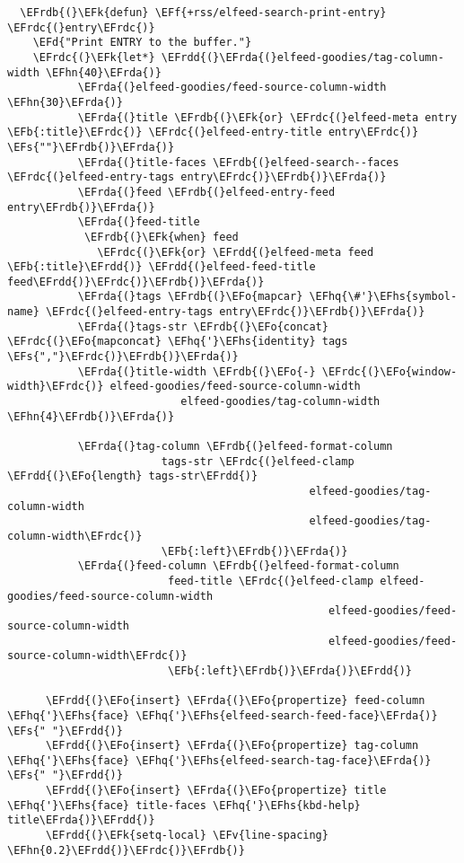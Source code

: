 \documentclass[c]{article}
\theoremstyle{plain}%
\theoremstyle{definition}
\theoremstyle{remark}
\newcommand{\EFs}[1]{\textcolor{EFs}{#1}} %
\newcommand{\EFd}[1]{\textcolor{EFd}{#1}} %
\newcommand{\EFk}[1]{\textcolor{EFk}{#1}} %
\newcommand{\EFb}[1]{\textcolor{EFb}{#1}} %
\newcommand{\EFf}[1]{\textcolor{EFf}{#1}} %
\newcommand{\EFv}[1]{\textcolor{EFv}{#1}} %
\newcommand{\EFo}[1]{\textcolor{EFo}{#1}} %
\newcommand{\EFhn}[1]{\textcolor{EFhn}{\textbf{#1}}} %
\newcommand{\EFhq}[1]{\textcolor{EFhq}{#1}} %
\newcommand{\EFhs}[1]{\textcolor{EFhs}{#1}} %
\newcommand{\EFrda}[1]{\textcolor{EFrda}{#1}} %
\newcommand{\EFrdb}[1]{\textcolor{EFrdb}{#1}} %
\newcommand{\EFrdc}[1]{\textcolor{EFrdc}{#1}} %
\newcommand{\EFrdd}[1]{\textcolor{EFrdd}{#1}} %
\begin{document}
\begin{Code}
\begin{Verbatim}
  \EFrdb{(}\EFk{defun} \EFf{+rss/elfeed-search-print-entry} \EFrdc{(}entry\EFrdc{)}
    \EFd{"Print ENTRY to the buffer."}
    \EFrdc{(}\EFk{let*} \EFrdd{(}\EFrda{(}elfeed-goodies/tag-column-width \EFhn{40}\EFrda{)}
           \EFrda{(}elfeed-goodies/feed-source-column-width \EFhn{30}\EFrda{)}
           \EFrda{(}title \EFrdb{(}\EFk{or} \EFrdc{(}elfeed-meta entry \EFb{:title}\EFrdc{)} \EFrdc{(}elfeed-entry-title entry\EFrdc{)} \EFs{""}\EFrdb{)}\EFrda{)}
           \EFrda{(}title-faces \EFrdb{(}elfeed-search--faces \EFrdc{(}elfeed-entry-tags entry\EFrdc{)}\EFrdb{)}\EFrda{)}
           \EFrda{(}feed \EFrdb{(}elfeed-entry-feed entry\EFrdb{)}\EFrda{)}
           \EFrda{(}feed-title
            \EFrdb{(}\EFk{when} feed
              \EFrdc{(}\EFk{or} \EFrdd{(}elfeed-meta feed \EFb{:title}\EFrdd{)} \EFrdd{(}elfeed-feed-title feed\EFrdd{)}\EFrdc{)}\EFrdb{)}\EFrda{)}
           \EFrda{(}tags \EFrdb{(}\EFo{mapcar} \EFhq{\#'}\EFhs{symbol-name} \EFrdc{(}elfeed-entry-tags entry\EFrdc{)}\EFrdb{)}\EFrda{)}
           \EFrda{(}tags-str \EFrdb{(}\EFo{concat} \EFrdc{(}\EFo{mapconcat} \EFhq{'}\EFhs{identity} tags \EFs{","}\EFrdc{)}\EFrdb{)}\EFrda{)}
           \EFrda{(}title-width \EFrdb{(}\EFo{-} \EFrdc{(}\EFo{window-width}\EFrdc{)} elfeed-goodies/feed-source-column-width
                           elfeed-goodies/tag-column-width \EFhn{4}\EFrdb{)}\EFrda{)}

           \EFrda{(}tag-column \EFrdb{(}elfeed-format-column
                        tags-str \EFrdc{(}elfeed-clamp \EFrdd{(}\EFo{length} tags-str\EFrdd{)}
                                               elfeed-goodies/tag-column-width
                                               elfeed-goodies/tag-column-width\EFrdc{)}
                        \EFb{:left}\EFrdb{)}\EFrda{)}
           \EFrda{(}feed-column \EFrdb{(}elfeed-format-column
                         feed-title \EFrdc{(}elfeed-clamp elfeed-goodies/feed-source-column-width
                                                  elfeed-goodies/feed-source-column-width
                                                  elfeed-goodies/feed-source-column-width\EFrdc{)}
                         \EFb{:left}\EFrdb{)}\EFrda{)}\EFrdd{)}

      \EFrdd{(}\EFo{insert} \EFrda{(}\EFo{propertize} feed-column \EFhq{'}\EFhs{face} \EFhq{'}\EFhs{elfeed-search-feed-face}\EFrda{)} \EFs{" "}\EFrdd{)}
      \EFrdd{(}\EFo{insert} \EFrda{(}\EFo{propertize} tag-column \EFhq{'}\EFhs{face} \EFhq{'}\EFhs{elfeed-search-tag-face}\EFrda{)} \EFs{" "}\EFrdd{)}
      \EFrdd{(}\EFo{insert} \EFrda{(}\EFo{propertize} title \EFhq{'}\EFhs{face} title-faces \EFhq{'}\EFhs{kbd-help} title\EFrda{)}\EFrdd{)}
      \EFrdd{(}\EFk{setq-local} \EFv{line-spacing} \EFhn{0.2}\EFrdd{)}\EFrdc{)}\EFrdb{)}


\end{Verbatim}
\end{Code}
\end{document}
